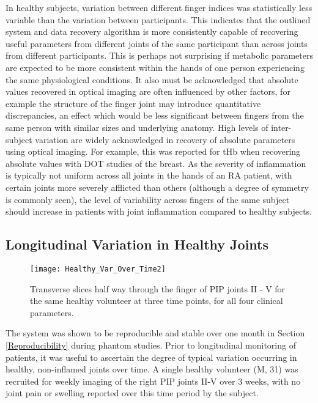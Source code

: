 \documentclass[twoside]{bhamthesis}
\theoremstyle{definition}
\begin{document}
In healthy subjects, variation between different finger indices was statistically less variable than the variation between participants. This indicates that the outlined system and data recovery algorithm is more consistently capable of recovering useful parameters from different joints of the same participant than across joints from different participants. This is perhaps not surprising if metabolic parameters are expected to be more consistent within the hands of one person experiencing the same physiological conditions. It also must be acknowledged that absolute values recovered in optical imaging are often influenced by other factors, for example the structure of the finger joint may introduce quantitative discrepancies, an effect which would be less significant between fingers from the same person with similar sizes and underlying anatomy. High levels of inter-subject variation are widely acknowledged in recovery of absolute parameters using optical imaging. For example, this was reported for tHb when recovering absolute values with DOT studies of the breast\cite{shah2001noninvasive,cubeddu2000effects}. As the severity of inflammation is typically not uniform across all joints in the hands of an RA patient, with certain joints more severely afflicted than others \cite{arnett1988american} (although a degree of symmetry is commonly seen), the level of variability across fingers of the same subject should increase in patients with joint inflammation compared to healthy subjects.

\subsection{Longitudinal Variation in Healthy Joints}
\label{Longitudinal Variation in Healthy Joints}

\begin{figure}[!ht]
\centering\texttt{[image: Healthy\_Var\_Over\_Time2]}
\caption{Transverse slices half way through the finger of PIP joints II - V for the same healthy volunteer at three time points, for all four clinical parameters.}
\label{Healthy_Var_Over_Time2}
\end{figure}

The system was shown to be reproducible and stable over one month in Section 
\ref{Reproducibility} during phantom studies. Prior to longitudinal monitoring of patients, it was useful to ascertain the degree of typical variation occurring in healthy, non-inflamed joints over time. A single healthy volunteer (M, 31) was recruited for weekly imaging of the right PIP joints II-V over 3 weeks, with no joint pain or swelling reported over this time period by the subject. 
\end{document}
